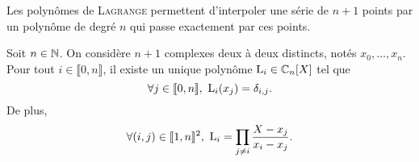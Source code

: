 Les polynômes de \textsc{Lagrange} permettent d'interpoler une série de $n+1$ points par un polynôme de degré $n$ qui passe exactement par ces points.

\begin{theo}{}
    Soit $n \in \mathbb{N}$. On considère $n + 1$ complexes deux à deux distincts, notés $x_0, \dots, x_n$. \\
    Pour tout $i \in \llbracket 0, n \rrbracket$, il existe un unique polynôme $\mathrm{L}_i \in \mathbb{C}_n[X]$ tel que 
    $$\forall j \in \llbracket 0, n \rrbracket,\ \mathrm{L}_i(x_j) = \delta_{i,j}.$$
    De plus,
        $$\forall (i, j) \in \llbracket 1, n \rrbracket^2,\ \mathrm{L}_i = \prod_{j \neq i} \frac{X-x_j}{x_i - x_j}.$$
\end{theo}


